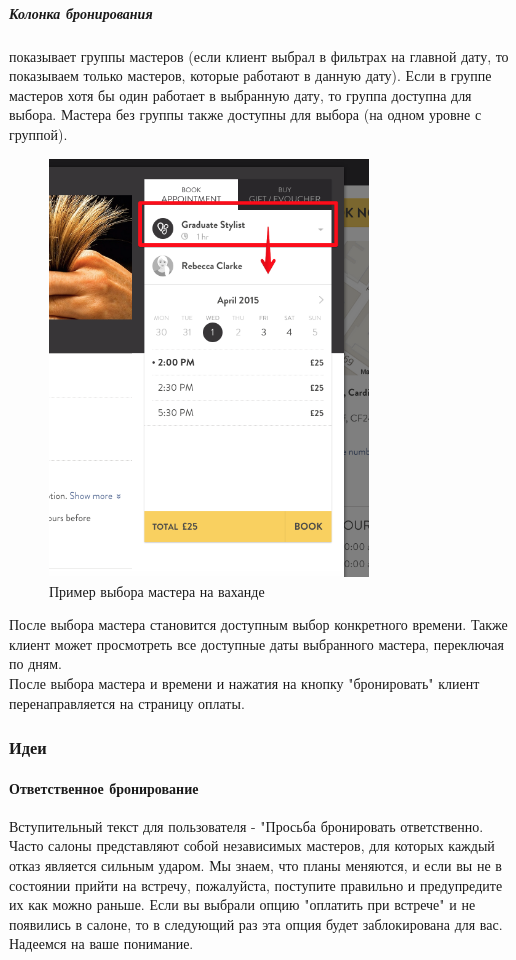 \documentclass[DIV=calc, paper=a4, fontsize=11pt]{scrartcl} %
\begin{document}
\subparagraph{Колонка бронирования} показывает группы мастеров (если клиент выбрал в фильтрах на главной дату, то показываем только мастеров, которые работают в данную дату). Если в группе мастеров хотя бы один работает в выбранную дату, то группа доступна для выбора. Мастера без группы также доступны для выбора (на одном уровне с группой).

\begin{figure}[H]
        \centering
        \includegraphics[width=320px]{before_booking.png}
        \caption{Пример выбора мастера на ваханде\label{fig:before_booking.png}}
        \end{figure}
        
После выбора мастера становится доступным выбор конкретного времени. Также клиент может просмотреть все доступные даты выбранного мастера, переключая по дням.
\\[0.5cm]
После выбора мастера и времени и нажатия на кнопку "бронировать" клиент перенаправляется на страницу оплаты.

\subsubsection{Идеи}

\paragraph{Ответственное бронирование}
Вступительный текст для пользователя - "Просьба бронировать ответственно. Часто салоны представляют собой независимых мастеров, для которых каждый отказ является сильным ударом. Мы знаем, что планы меняются, и если вы не в состоянии прийти на встречу, пожалуйста, поступите правильно и предупредите их как можно раньше. Если вы выбрали опцию "оплатить при встрече" и не появились в салоне, то в следующий раз эта опция будет заблокирована для вас. Надеемся на ваше понимание.
\end{document}
